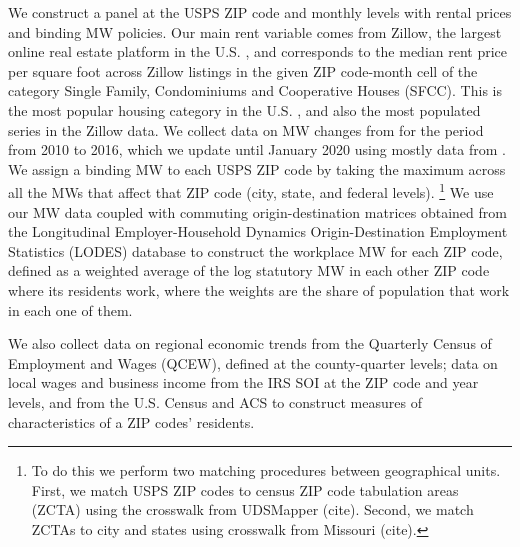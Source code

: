We construct a panel at the USPS ZIP code and monthly levels with rental prices 
and binding MW policies.
Our main rent variable comes from Zillow, the largest online real estate platform 
in the U.S. \parencite{realestateagentpdx, investopedia}, and corresponds to the 
median rent price per square foot across Zillow listings in the given ZIP code-month 
cell of the category Single Family, Condominiums and Cooperative Houses (SFCC). 
This is the most popular housing category in the U.S. \parencite{fernald2020americas}, 
and also the most populated series in the Zillow data.
We collect data on MW changes from \textcite{VaghulZipperer2016} for the 
period from 2010 to 2016, which we update until January 2020 using mostly data from
\textcite{BerkeleyLaborCenter}.
We assign a binding MW to each USPS ZIP code by taking the maximum across all the
MWs that affect that ZIP code (city, state, and federal levels).%
\footnote{To do this we perform two matching procedures between geographical units.
First, we match USPS ZIP codes to census ZIP code tabulation areas (ZCTA) using 
the crosswalk from UDSMapper (cite). %
Second, we match ZCTAs to city and states using crosswalk from Missouri (cite).}
We use our MW data coupled with commuting origin-destination matrices obtained from 
the Longitudinal Employer-Household Dynamics Origin-Destination Employment 
Statistics (LODES) %
database to construct the workplace MW for each ZIP code,
defined as a weighted average of the log statutory MW in each other ZIP code where 
its residents work, where the weights are the share of population that work in each 
one of them.

We also collect data on regional economic trends from the Quarterly Census of 
Employment and Wages (QCEW), defined at the county-quarter levels;
data on local wages and business income from the IRS SOI %
at the ZIP code and year levels, and from the U.S. Census and ACS to 
construct measures of characteristics of a ZIP codes' residents.


